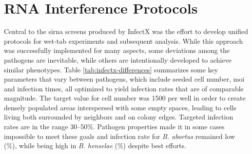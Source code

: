 \section{RNA Interference Protocols}
Central to the \gls{sirna} screens produced by InfectX was the effort to develop unified protocols for wet-tab experiments and subsequent analysis. While this approach was successfully implemented for many aspects, some deviations among the pathogens are inevitable, while others are intentionally developed to achieve similar phenotypes. Table \ref{tab:infectx-differences} summarizes some key parameters that vary between pathogens, which include seeded cell number, \gls{moi} and infection times, all optimized to yield infection rates that are of comparable magnitude. The target value for cell number was 1500 per well in order to create densely populated areas interspersed with some empty spaces, leading to cells living both surrounded by neighbors and on colony edges. Targeted infection rates are in the range 30--50\%. Pathogen properties made it in some cases impossible to meet these goals and infection rate for \textit{B. abortus} remained low (\%), while being high in \textit{B. henselae} (\%) despite best efforts.

